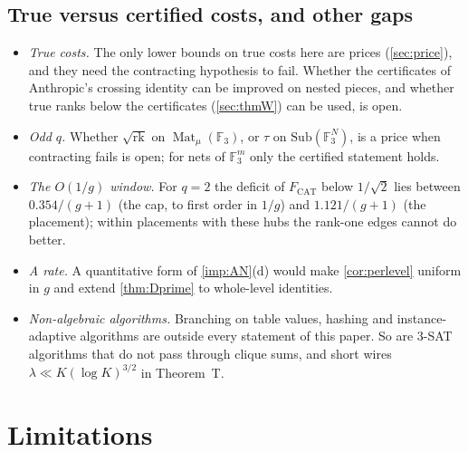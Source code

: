 \documentclass[10pt]{amsart}
\theoremstyle{plain}
\theoremstyle{definition}
\theoremstyle{remark}
\numberwithin{equation}{section}
\newcommand{\F}{\mathbb{F}}
\newcommand{\rk}{\operatorname{rk}}
\newcommand{\Mat}{\operatorname{Mat}}
\newcommand{\Fcat}{F_{\mathrm{CAT}}}
\begin{document}
\subsection{True versus certified costs, and other gaps}
\begin{itemize}
\item \emph{True costs.} The only lower bounds on true costs here are prices (\cref{sec:price}), and they need
the contracting hypothesis to fail. Whether the certificates of Anthropic's crossing identity can be improved
on nested pieces, and whether true ranks below the certificates (\cref{sec:thmW}) can be used, is open.
\item \emph{Odd $q$.} Whether $\sqrt{\rk}$ on $\Mat_\mu(\F_3)$, or $\tau$ on $\mathrm{Sub}(\F_3^N)$, is a price when
contracting fails is open; for nets of $\F_3^m$ only the certified statement holds.
\item \emph{The $O(1/g)$ window.} For $q=2$ the deficit of $\Fcat$ below $1/\sqrt2$ lies between
$0.354/(g+1)$ (the cap, to first order in $1/g$) and $1.121/(g+1)$ (the placement); within placements with these hubs the rank-one edges cannot do better.
\item \emph{A rate.} A quantitative form of \cref{imp:AN}(d) would make \cref{cor:perlevel} uniform in $g$
and extend \cref{thm:Dprime} to whole-level identities.
\item \emph{Non-algebraic algorithms.} Branching on table values, hashing and instance-adaptive algorithms
are outside every statement of this paper. So are 3-SAT algorithms that do not pass through clique sums, and
short wires $\lambda\ll K(\log K)^{3/2}$ in Theorem~T.
\end{itemize}

\section{Limitations}\label{sec:limits}
\end{document}
